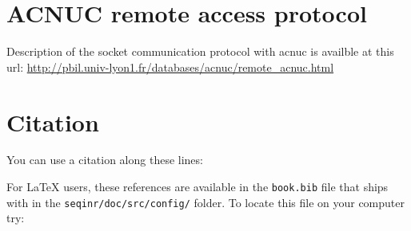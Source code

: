 \documentclass{article}
\begin{document}
\section{ACNUC remote access protocol}
Description of the socket communication protocol with acnuc is availble at this url:
\url{http://pbil.univ-lyon1.fr/databases/acnuc/remote_acnuc.html}




\section{Citation} 

You can use a citation along these lines:

\vspace{0.2cm}

\noindent{}

\vspace{0.2cm}

For \LaTeX{} users, these references are available in the \texttt{book.bib} file that ships
with \seqinr{} in the \texttt{seqinr/doc/src/config/} folder. To locate this file on your
computer try:
\end{document}
